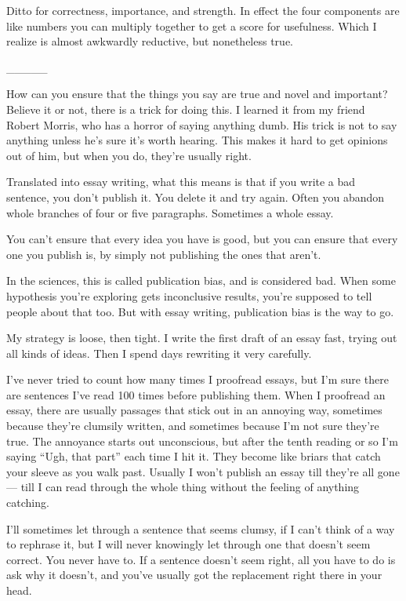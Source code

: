 Ditto for correctness, importance, and strength. In effect the four
components are like numbers you can multiply together to get a score for
usefulness. Which I realize is almost awkwardly reductive, but
nonetheless true.

\_\_\_\_\_

How can you ensure that the things you say are true and novel and
important? Believe it or not, there is a trick for doing this. I learned
it from my friend Robert Morris, who has a horror of saying anything
dumb. His trick is not to say anything unless he's sure it's worth
hearing. This makes it hard to get opinions out of him, but when you do,
they're usually right.

Translated into essay writing, what this means is that if you write a
bad sentence, you don't publish it. You delete it and try again. Often
you abandon whole branches of four or five paragraphs. Sometimes a whole
essay.

You can't ensure that every idea you have is good, but you can ensure
that every one you publish is, by simply not publishing the ones that
aren't.

In the sciences, this is called publication bias, and is considered bad.
When some hypothesis you're exploring gets inconclusive results, you're
supposed to tell people about that too. But with essay writing,
publication bias is the way to go.

My strategy is loose, then tight. I write the first draft of an essay
fast, trying out all kinds of ideas. Then I spend days rewriting it very
carefully.

I've never tried to count how many times I proofread essays, but I'm
sure there are sentences I've read 100 times before publishing them.
When I proofread an essay, there are usually passages that stick out in
an annoying way, sometimes because they're clumsily written, and
sometimes because I'm not sure they're true. The annoyance starts out
unconscious, but after the tenth reading or so I'm saying ``Ugh, that
part'' each time I hit it. They become like briars that catch your
sleeve as you walk past. Usually I won't publish an essay till they're
all gone --- till I can read through the whole thing without the feeling
of anything catching.

I'll sometimes let through a sentence that seems clumsy, if I can't
think of a way to rephrase it, but I will never knowingly let through
one that doesn't seem correct. You never have to. If a sentence doesn't
seem right, all you have to do is ask why it doesn't, and you've usually
got the replacement right there in your head.

